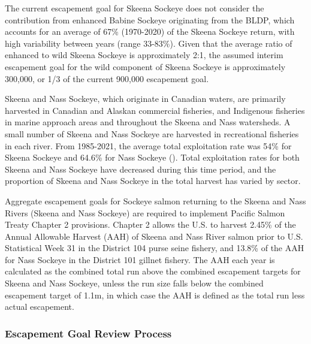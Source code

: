 \documentclass[french,11pt]{book}
\begin{document}
The current escapement goal for Skeena Sockeye does not consider the contribution from enhanced Babine Sockeye originating from the BLDP, which accounts for an average of 67\% (1970-2020) of the Skeena Sockeye return, with high variability between years (range 33-83\%). Given that the average ratio of enhanced to wild Skeena Sockeye is approximately 2:1, the assumed interim escapement goal for the wild component of Skeena Sockeye is approximately 300,000, or 1/3 of the current 900,000 escapement goal.

Skeena and Nass Sockeye, which originate in Canadian waters, are primarily harvested in Canadian and Alaskan commercial fisheries, and Indigenous fisheries in marine approach areas and throughout the Skeena and Nass watersheds. A small number of Skeena and Nass Sockeye are harvested in recreational fisheries in each river. From 1985-2021, the average total exploitation rate was 54\% for Skeena Sockeye and 64.6\% for Nass Sockeye (). Total exploitation rates for both Skeena and Nass Sockeye have decreased during this time period, and the proportion of Skeena and Nass Sockeye in the total harvest has varied by sector.

Aggregate escapement goals for Sockeye salmon returning to the Skeena and Nass Rivers (Skeena and Nass Sockeye) are required to implement Pacific Salmon Treaty Chapter 2 provisions. Chapter 2 allows the U.S. to harvest 2.45\% of the Annual Allowable Harvest (AAH) of Skeena and Nass River salmon prior to U.S. Statistical Week 31 in the District 104 purse seine fishery, and 13.8\% of the AAH for Nass Sockeye in the District 101 gillnet fishery. The AAH each year is calculated as the combined total run above the combined escapement targets for Skeena and Nass Sockeye, unless the run size falls below the combined escapement target of 1.1m, in which case the AAH is defined as the total run less actual escapement.

\subsubsection{Escapement Goal Review Process}\label{EGProcess}
\end{document}
